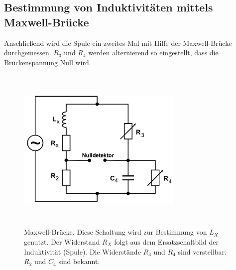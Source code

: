 \subsection{Bestimmung von Induktivitäten mittels Maxwell-Brücke}
Anschließend wird die Spule ein zweites Mal mit Hilfe der Maxwell-Brücke durchgemessen.
\newline
$R_3$ und $R_4$ werden alternierend so eingestellt, dass die Brückenspannung
Null wird. 
\begin{figure}
    \centering
    \includegraphics[width=8cm, height=8cm]{build/maxwell.png}
    \caption{Maxwell-Brücke. Diese Schaltung wird zur Bestimmung
    von $L_X$ genutzt. Der Widerstand $R_X$ folgt aus dem
    Ersatzschaltbild der Induktivität (Spule). Die Widerstände
    $R_3$ und $R_4$ sind verstellbar. $R_2$ und $C_4$ sind bekannt.}
    \label{maxwell}
\end{figure}

